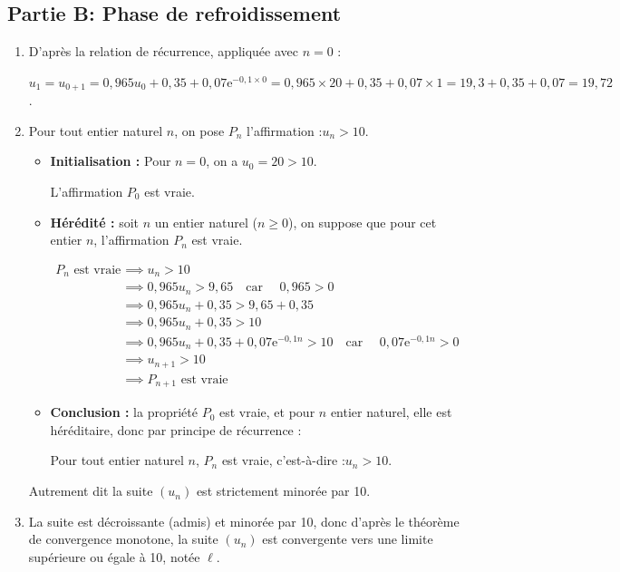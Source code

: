 \documentclass[10pt]{article}
\providecommand{\e}{{\mathrm{e}}}
\begin{document}
	\subsection*{Partie B: Phase de refroidissement}
		\begin{enumerate}
			\item D'après la relation de récurrence, appliquée avec $n = 0$ :

			$u_{1}=u_{0 + 1} = 0,965u_0 + 0,35 + 0,07\e^{-0,1\times 0} = 0,965 \times 20 + 0,35 + 0,07\times 1 = 19,3 + 0,35 + 0,07 = 19,72$.

			\item Pour tout entier naturel $n$, on pose $P_n$ l'affirmation :\quad \og $u_{n}>10$\fg{}.

			\begin{itemize}[label=\textbullet~]
				\item \textbf{Initialisation :} Pour $n= 0$, on a $u_0 = 20 > 10$.

				L'affirmation $P_0$ est vraie.

				\item \textbf{Hérédité :} soit $n$ un entier naturel ($n \geqslant 0$), on suppose que pour cet entier $n$, l'affirmation $P_n$ est vraie.

				$\begin{aligned}
					P_n \text{ est vraie}
						&\implies u_n > 10\\
						&\implies 0,965 u_n > 9,65 \quad \text{car } \quad 0,965 > 0\\
						&\implies 0,965 u_n + 0,35 > 9,65 + 0,35\\
						&\implies 0,965 u_n + 0,35 > 10\\
						&\implies 0,965 u_n + 0,35 + 0,07\e^{-0,1n}> 10\quad \text{car } \quad 0,07\e^{-0,1n} > 0\\
						&\implies u_{n+1} > 10\\
						&\implies P_{n+1} \text{ est vraie}
				\end{aligned}$
				\item \textbf{Conclusion :} la propriété $P_0$ est vraie, et pour $n$ entier naturel, elle est héréditaire, donc par principe de récurrence :

				Pour tout entier naturel $n$, $P_n$ est vraie, c'est-à-dire :\quad $u_n > 10$.
			\end{itemize}

			Autrement dit la suite $(u_n)$ est strictement minorée par 10.

			\item La suite est décroissante (admis) et minorée par 10, donc d'après le théorème de convergence monotone, la suite $(u_{n})$ est convergente vers une limite supérieure ou égale à 10, notée $\ell$.


\end{enumerate}
\end{document}
